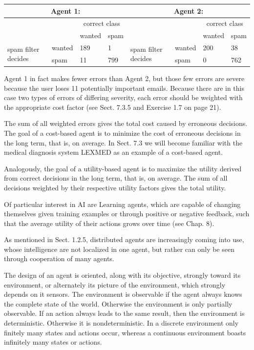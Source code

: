 \documentclass[10pt]{book}
\begin{document}
\begin{center}
\begin{tabular}{|l|l|l|l|l|l|l|l|}
\hline
\multicolumn{4}{|c|}{Agent 1:} & \multicolumn{4}{|c|}{Agent 2:} \\
\hline
\multicolumn{2}{|c|}{\multirow{2}{*}{}} & \multicolumn{2}{|c|}{correct class} & \multicolumn{2}{|c|}{\multirow{2}{*}{}} & \multicolumn{2}{|c|}{correct class} \\
\hline
 &  & wanted & spam &  &  & wanted & spam \\
\hline
\multirow{2}{*}{spam filter decides} & wanted & 189 & 1 & \multirow{2}{*}{spam filter decides} & wanted & 200 & 38 \\
\hline
 & spam & 11 & 799 &  & spam & 0 & 762 \\
\hline
\end{tabular}
\end{center}

Agent 1 in fact makes fewer errors than Agent 2, but those few errors are severe because the user loses 11 potentially important emails. Because there are in this case two types of errors of differing severity, each error should be weighted with the appropriate cost factor (see Sect. 7.3.5 and Exercise 1.7 on page 21).

The sum of all weighted errors gives the total cost caused by erroneous decisions. The goal of a cost-based agent is to minimize the cost of erroneous decisions in the long term, that is, on average. In Sect. 7.3 we will become familiar with the medical diagnosis system LEXMED as an example of a cost-based agent.

Analogously, the goal of a utility-based agent is to maximize the utility derived from correct decisions in the long term, that is, on average. The sum of all decisions weighted by their respective utility factors gives the total utility.

Of particular interest in AI are Learning agents, which are capable of changing themselves given training examples or through positive or negative feedback, such that the average utility of their actions grows over time (see Chap. 8).

As mentioned in Sect. 1.2.5, distributed agents are increasingly coming into use, whose intelligence are not localized in one agent, but rather can only be seen through cooperation of many agents.

The design of an agent is oriented, along with its objective, strongly toward its environment, or alternately its picture of the environment, which strongly depends on it sensors. The environment is observable if the agent always knows the complete state of the world. Otherwise the environment is only partially observable. If an action always leads to the same result, then the environment is deterministic. Otherwise it is nondeterministic. In a discrete environment only finitely many states and actions occur, whereas a continuous environment boasts infinitely many states or actions.
\end{document}
